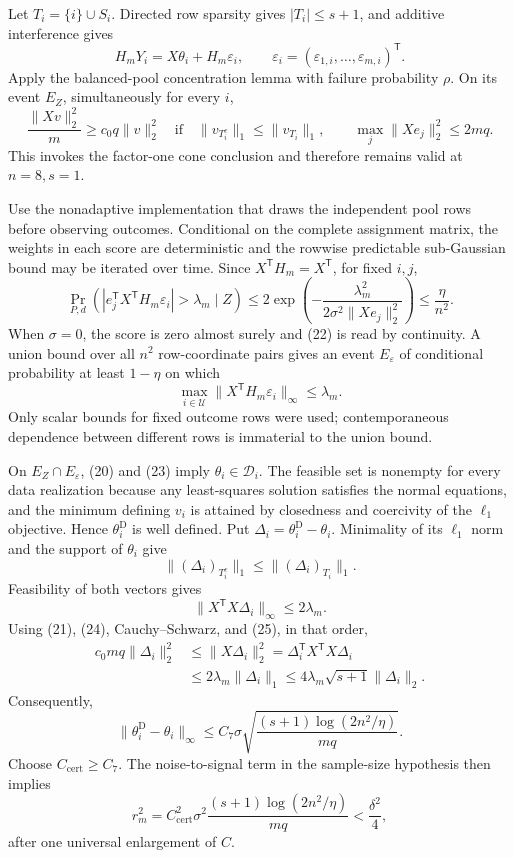 Let \(T_i=\{i\}\cup S_i\).  Directed row sparsity gives \(|T_i|\le s+1\), and additive interference gives
\[
 H_mY_i=X\theta_i+H_m\varepsilon_i,
 \qquad \varepsilon_i=(\varepsilon_{1,i},\ldots,\varepsilon_{m,i})^{\mathsf T}.
 \tag{20}
\]
Apply the balanced-pool concentration lemma with failure probability \(\rho\).  On its event \(E_Z\), simultaneously for every \(i\),
\[
 \frac{\lVert Xv\rVert_2^2}{m}\ge c_0q\lVert v\rVert_2^2
 \quad\text{if}\quad
 \lVert v_{T_i^c}\rVert_1\le\lVert v_{T_i}\rVert_1,
 \qquad
 \max_j\lVert Xe_j\rVert_2^2\le2mq.
 \tag{21}
\]
This invokes the factor-one cone conclusion and therefore remains valid at \(n=8,s=1\).

Use the nonadaptive implementation that draws the independent pool rows before observing outcomes.  Conditional on the complete assignment matrix, the weights in each score are deterministic and the rowwise predictable sub-Gaussian bound may be iterated over time.  Since \(X^{\mathsf T}H_m=X^{\mathsf T}\), for fixed \(i,j\),
\[
 \Pr_{P,d}\!\left(
  |e_j^{\mathsf T}X^{\mathsf T}H_m\varepsilon_i|>\lambda_m\mid Z
 \right)
 \le2\exp\!\left(-\frac{\lambda_m^2}
 {2\sigma^2\lVert Xe_j\rVert_2^2}\right)
 \le\frac{\eta}{n^2}.
 \tag{22}
\]
When \(\sigma=0\), the score is zero almost surely and (22) is read by continuity.  A union bound over all \(n^2\) row-coordinate pairs gives an event \(E_\varepsilon\) of conditional probability at least \(1-\eta\) on which
\[
 \max_{i\in\mathcal U}\lVert X^{\mathsf T}H_m\varepsilon_i\rVert_\infty
 \le\lambda_m.
 \tag{23}
\]
Only scalar bounds for fixed outcome rows were used; contemporaneous dependence between different rows is immaterial to the union bound.

On \(E_Z\cap E_\varepsilon\), (20) and (23) imply \(\theta_i\in\mathcal D_i\).  The feasible set is nonempty for every data realization because any least-squares solution satisfies the normal equations, and the minimum defining \(v_i\) is attained by closedness and coercivity of the \(\ell_1\) objective.  Hence \(\theta_i^{\mathrm D}\) is well defined.  Put \(\Delta_i=\theta_i^{\mathrm D}-\theta_i\).  Minimality of its \(\ell_1\) norm and the support of \(\theta_i\) give
\[
 \lVert(\Delta_i)_{T_i^c}\rVert_1
 \le\lVert(\Delta_i)_{T_i}\rVert_1.
 \tag{24}
\]
Feasibility of both vectors gives
\[
 \lVert X^{\mathsf T}X\Delta_i\rVert_\infty\le2\lambda_m.
 \tag{25}
\]
Using (21), (24), Cauchy--Schwarz, and (25), in that order,
\[
 \begin{aligned}
 c_0mq\lVert\Delta_i\rVert_2^2
 &\le\lVert X\Delta_i\rVert_2^2
 =\Delta_i^{\mathsf T}X^{\mathsf T}X\Delta_i\\
 &\le2\lambda_m\lVert\Delta_i\rVert_1
 \le4\lambda_m\sqrt{s+1}\lVert\Delta_i\rVert_2.
 \end{aligned}
 \tag{26}
\]
Consequently,
\[
 \lVert\theta_i^{\mathrm D}-\theta_i\rVert_\infty
 \le C_7\sigma\sqrt{\frac{(s+1)\log(2n^2/\eta)}{mq}}.
 \tag{27}
\]
Choose \(C_{\mathrm{cert}}\ge C_7\).  The noise-to-signal term in the sample-size hypothesis then implies
\[
 r_m^2=C_{\mathrm{cert}}^2\sigma^2
 \frac{(s+1)\log(2n^2/\eta)}{mq}<\frac{\delta^2}{4},
 \tag{28}
\]
after one universal enlargement of \(C\).

